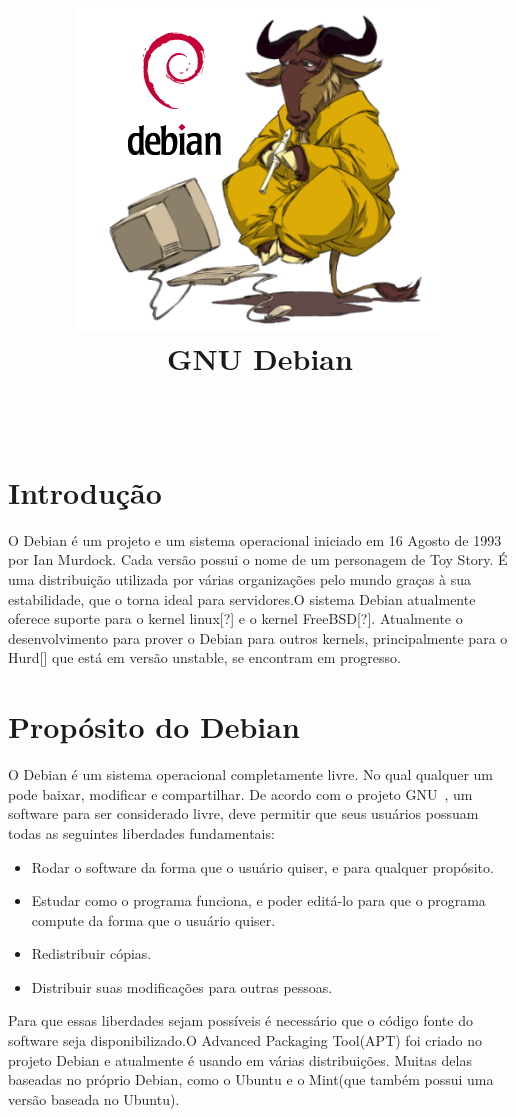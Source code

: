 \documentclass[conference]{IEEEtran}
\title{\includegraphics[scale = 0.2,trim = 0 0 0 0,clip = true]{GnuDebian.png}\\
	GNU Debian}
\author{	
\IEEEauthorblockN{Francisco Anderson Bezerra Rodrigues, Marcelo Bulhões Fonseca, Vitor Silva De Deus} \\
\IEEEauthorblockA{Departamento de Ciência da Computação, \\ Universidade de Brasília\\
}
}
\begin{document}
 

\maketitle
{}  




\section{Introdução}\label{sec:intro}
O Debian é um projeto e um sistema operacional iniciado em 16 Agosto de 1993 por Ian Murdock\cite{DebianHistory}. Cada versão possui o nome de um personagem de Toy Story. É uma distribuição utilizada por várias organizações pelo mundo\cite{DebianUsers} graças à sua estabilidade, que o torna ideal para servidores.O sistema Debian atualmente oferece suporte para o kernel linux[?] e o kernel FreeBSD[?]. Atualmente o desenvolvimento para prover o Debian para outros kernels, principalmente para o Hurd[] que está em versão unstable, se encontram em progresso. 

\section{Propósito do Debian}\label{sec:prop}
O Debian é um sistema operacional completamente livre. No qual qualquer um pode baixar, modificar e compartilhar. De acordo com o projeto GNU~\cite{FreeSoftware}, um software para ser considerado livre, deve permitir que seus usuários possuam todas as seguintes liberdades fundamentais:
\begin{itemize}
	\item Rodar o software da forma que o usuário quiser, e para qualquer propósito.
	\item Estudar como o programa funciona, e poder editá-lo para que o programa compute da forma que o usuário quiser.
	\item Redistribuir cópias.
	\item Distribuir suas modificações para outras pessoas.
\end{itemize}

Para que essas liberdades sejam possíveis é necessário que o código fonte do software seja disponibilizado.O Advanced Packaging Tool(APT) foi criado no projeto Debian e atualmente é usando em várias distribuições. Muitas delas baseadas no próprio Debian, como o Ubuntu e o Mint(que também possui uma versão baseada no Ubuntu).
\end{document}

